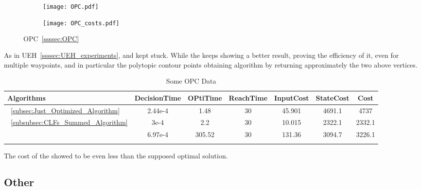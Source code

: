  \begin{figure}[htbp]
  \begin{subfigure}{0.5\textwidth}
    \centering
    \texttt{[image: OPC.pdf]}
  \label{fig:OPC_CostEvol}
  \end{subfigure}
  \begin{subfigure}{0.6\textwidth}
    \centering
    \texttt{[image: OPC\_costs.pdf]}
  \label{fig:OPC_trajectory}
  \end{subfigure}
  \caption{OPC~\ref{ssssec:OPC}}
\label{fig:OPCTrajectory_and_CostEvol}
\end{figure}


As in UEH~\ref{ssssec:UEH_experiments},  and   kept stuck. While the  keeps showing a better result, proving the efficiency of it, even for multiple waypoints, and in particular the polytopic contour points obtaining algorithm by returning approximately the two above vertices. 


  \bgroup
 \begin{xltabular}{\textwidth}{|l|cccccc|}
   \toprule
   Algorithms   & DecisionTime & OPtiTime & ReachTime  & InputCost   & StateCost & Cost           \\
   \midrule
    ~\ref{subsec:Just_Optimized_Algorithm}           & 2.44e-4 & 1.48 & 30 & 45.901  & 4691.1  & 4737 \\
    ~\ref{subsubsec:CLFs_Summed_Algorithm}        & 3e-4 & 2.2     & 30 & 10.015 & 2322.1 &  2332.1 \\
                          & 6.97e-4  & 305.52     & 30  & 131.36 & 3094.7 & 3226.1 \\
    \midrule
    \caption{Some OPC Data}
    \label{tab:Some_OPC_Data}\\
   \end{xltabular}
 \egroup


The cost of the  showed to be even less than the supposed optimal solution.


\newpage %

\subsection{Other}
\label{subsec:other_experiments}

